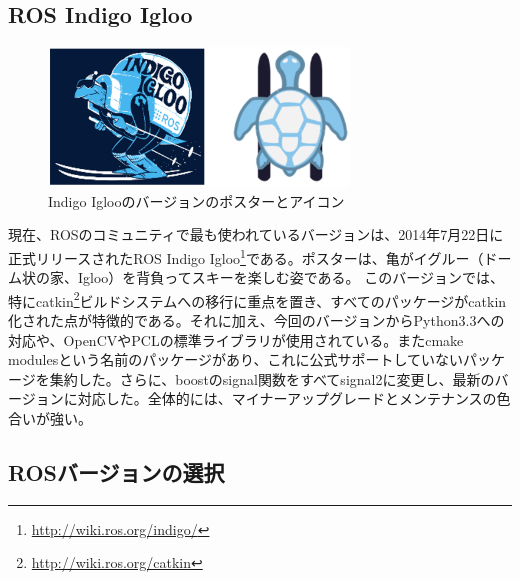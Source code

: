 {{%
\subsection{ROS Indigo Igloo}

\begin{figure}[h]
  \centering
  \includegraphics[width=8cm]{pictures/chapter1/pic_01_08.png}
  \caption{Indigo Iglooのバージョンのポスターとアイコン}
\end{figure}

現在、ROSのコミュニティで最も使われているバージョンは、2014年7月22日に正式リリースされたROS Indigo Igloo\footnote{\url{http://wiki.ros.org/indigo/}}である。ポスターは、亀がイグルー（ドーム状の家、Igloo）を背負ってスキーを楽しむ姿である。
このバージョンでは、特にcatkin\footnote{\url{http://wiki.ros.org/catkin}}ビルドシステムへの移行に重点を置き、すべてのパッケージがcatkin化された点が特徴的である。それに加え、今回のバージョンからPython3.3への対応や、OpenCVやPCLの標準ライブラリが使用されている。またcmake modulesという名前のパッケージがあり、これに公式サポートしていないパッケージを集約した。さらに、boostのsignal関数をすべてsignal2に変更し、最新のバージョンに対応した。全体的には、マイナーアップグレードとメンテナンスの色合いが強い。

\subsection{ROSバージョンの選択}

}}
